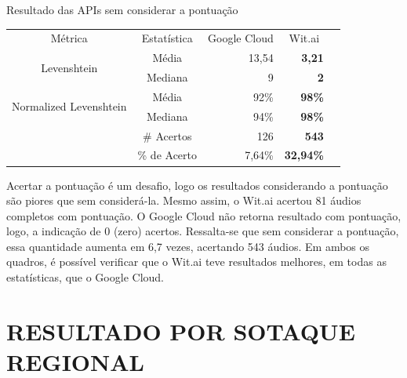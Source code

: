 \begin{quadro}[h]
\caption{Resultado das APIs sem considerar a pontuação} \label{Tabela_geral_sem_pontuacao}
\centering
\begin{tabular}{c|c|r|r|l}
\cline{1-4}
\multicolumn{1}{|c|}{Métrica}                                 & Estatística  & \multicolumn{1}{c|}{Google Cloud} & \multicolumn{1}{c|}{Wit.ai} &  \\ \cline{1-4}
\multicolumn{1}{|c|}{\multirow{2}{*}{Levenshtein}}            & Média        & 13,54                           & \textbf{3,21}                      &  \\ \cline{2-4}
\multicolumn{1}{|c|}{}                                        & Mediana      & 9                                 & \textbf{2}                           &  \\ \cline{1-4}
\multicolumn{1}{|c|}{\multirow{2}{*}{Normalized Levenshtein}} & Média        & 92\%                            & \textbf{98\%}                      &  \\ \cline{2-4}
\multicolumn{1}{|c|}{}                                        & Mediana      & 94\%                            & \textbf{98\%}                      &  \\ \cline{1-4}
\multicolumn{1}{l|}{}                                         & \# Acertos   & 126                               & \textbf{543}                         &  \\ \cline{2-4}
\multicolumn{1}{l|}{}                                         & \% de Acerto & 7,64\%                            & \textbf{32,94\%}             &  \\ \cline{2-4}
\end{tabular}
\end{quadro}

Acertar a pontuação é um desafio, logo os resultados considerando a pontuação são piores que sem considerá-la. Mesmo assim, o Wit.ai acertou 81 áudios completos com pontuação. O Google Cloud não retorna resultado com pontuação, logo, a indicação de 0 (zero) acertos.  Ressalta-se que sem considerar a pontuação, essa quantidade aumenta em 6,7 vezes, acertando 543 áudios. Em ambos os quadros, é possível verificar que o Wit.ai teve resultados melhores, em todas as estatísticas, que o Google Cloud. 

\FloatBarrier

\section{RESULTADO POR SOTAQUE REGIONAL}

